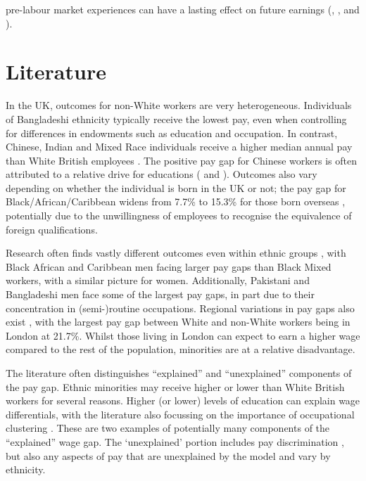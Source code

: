 \documentclass[class=article, crop=false]{standalone}
\begin{document}
pre-labour market experiences can have a lasting effect on future earnings (\citet{Altonji}, \citet{Hedman}, and \citet{Berthoud}). 

\section{Literature}
\label{sec:Literature}
In the UK, outcomes for non-White workers are very heterogeneous. Individuals of Bangladeshi ethnicity typically receive the lowest pay, even when controlling for differences in endowments such as education and occupation. In contrast, Chinese, Indian and Mixed Race individuals receive a higher median annual pay than White British employees \citep{ONSe}. The positive pay gap for Chinese workers is often attributed to a relative drive for educations (\citet{Leslie} and \citet{Berthoud}). Outcomes also vary depending on whether the individual is born in the UK or not; the pay gap for Black/African/Caribbean widens from 7.7\% to 15.3\% for those born overseas \citep{ONSe}, potentially due to the unwillingness of employees to recognise the equivalence of foreign qualifications.

Research often finds vastly different outcomes even within ethnic groups \citep{Heath}, with Black African and Caribbean men facing larger pay gaps than Black Mixed workers, with a similar picture for women. Additionally, Pakistani and Bangladeshi men face some of the largest pay gaps, in part due to their concentration in (semi-)routine occupations. Regional variations in pay gaps also exist \citep{ONSe}, with the largest pay gap between White and non-White workers being in London at 21.7\%. Whilst those living in London can expect to earn a higher wage compared to the rest of the population, minorities are at a relative disadvantage. 

The literature often distinguishes \enquote{explained} and \enquote{unexplained} components of the pay gap. Ethnic minorities may receive higher or lower than White British workers for several reasons. Higher (or lower) levels of education can explain wage differentials, with the literature also focussing on the importance of occupational clustering \citep{Brynin}. These are two examples of potentially many components of the \enquote{explained} wage gap. The \enquote*{unexplained} portion includes pay discrimination \citep{Blackaby}, but also any aspects of pay that are unexplained by the model and vary by ethnicity. %
\end{document}
